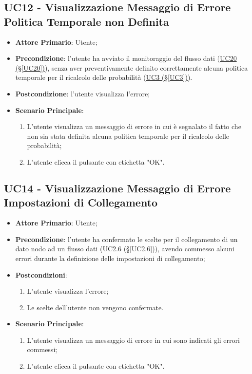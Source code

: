 \pagebreak

\subsection{UC12 - Visualizzazione Messaggio di Errore Politica Temporale non Definita}\label{UC12}
\begin{itemize}
\item \textbf{Attore Primario}: Utente;
\item \textbf{Precondizione}: l'utente ha avviato il monitoraggio del flusso dati (\hyperref[UC20]{UC20 							(§\ref*{UC20})}), senza aver preventivamente definito correttamente alcuna politica temporale per il ricalcolo delle probabilità (\hyperref[UC3]{UC3 (§\ref*{UC3})}).
\item \textbf{Postcondizione}: l'utente visualizza l'errore;
\item \textbf{Scenario Principale}:
	\begin{enumerate}
	\item L'utente visualizza un messaggio di errore in cui è segnalato il fatto che non sia stata definita alcuna 				politica temporale per il ricalcolo delle probabilità;
	\item L'utente clicca il pulsante con etichetta "OK".
	\end{enumerate}
\end{itemize}

\newpage

\subsection{UC14 - Visualizzazione Messaggio di Errore Impostazioni di Collegamento}\label{UC14}
\begin{itemize}
\item \textbf{Attore Primario}: Utente;
\item \textbf{Precondizione}: l'utente ha confermato le scelte per il collegamento di un dato nodo ad un flusso dati (\hyperref[UC2.6]{UC2.6 (§\ref*{UC2.6})}), avendo commesso alcuni errori durante la definizione delle impostazioni di collegamento;
\item \textbf{Postcondizioni}:
	\begin{enumerate}
	\item L'utente visualizza l'errore;
	\item Le scelte dell'utente non vengono confermate.
	\end{enumerate}
\item \textbf{Scenario Principale}:
	\begin{enumerate}
	\item L'utente visualizza un messaggio di errore in cui sono indicati gli errori commessi;
	\item L'utente clicca il pulsante con etichetta "OK".
	\end{enumerate}
\end{itemize}

